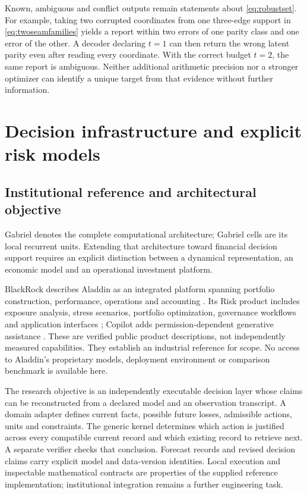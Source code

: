 \documentclass[11pt,a4paper]{article}
\theoremstyle{definition}\newtheorem{definition}[theorem]{Definition}
\begin{document}
Known, ambiguous and conflict outputs remain statements about \eqref{eq:robustset}. For example, taking two corrupted coordinates from one three-edge support in \eqref{eq:twoseamfamilies} yields a report within two errors of one parity class and one error of the other. A decoder declaring $t=1$ can then return the wrong latent parity even after reading every coordinate. With the correct budget $t=2$, the same report is ambiguous. Neither additional arithmetic precision nor a stronger optimizer can identify a unique target from that evidence without further information.

\section{Decision infrastructure and explicit risk models}\label{sec:riskinfra}
\subsection{Institutional reference and architectural objective}
Gabriel denotes the complete computational architecture; Gabriel cells are its local recurrent units. Extending that architecture toward financial decision support requires an explicit distinction between a dynamical representation, an economic model and an operational investment platform.

BlackRock describes Aladdin as an integrated platform spanning portfolio construction, performance, operations and accounting \cite{blackrock2026aladdin}. Its Risk product includes exposure analysis, stress scenarios, portfolio optimization, governance workflows and application interfaces \cite{blackrock2026risk}; Copilot adds permission-dependent generative assistance \cite{blackrock2026copilot}. These are verified public product descriptions, not independently measured capabilities. They establish an industrial reference for scope. No access to Aladdin's proprietary models, deployment environment or comparison benchmark is available here.

The research objective is an independently executable decision layer whose claims can be reconstructed from a declared model and an observation transcript. A domain adapter defines current facts, possible future losses, admissible actions, units and constraints. The generic kernel determines which action is justified across every compatible current record and which existing record to retrieve next. A separate verifier checks that conclusion. Forecast records and revised decision claims carry explicit model and data-version identities. Local execution and inspectable mathematical contracts are properties of the supplied reference implementation; institutional integration remains a further engineering task.
\end{document}
